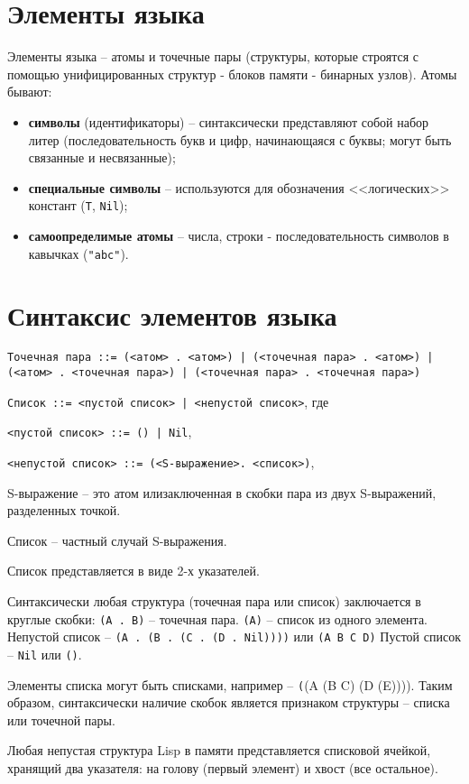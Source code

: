 \section{Элементы языка}

Элементы языка -- атомы и точечные пары (структуры, которые строятся с помощью унифицированных структур - блоков памяти - бинарных узлов). Атомы бывают:
\begin{itemize}
    \item \textbf{символы} (идентификаторы) -- синтаксически представляют собой набор литер (последовательность букв и цифр, начинающаяся с буквы; могут быть связанные и несвязанные);
    \item \textbf{специальные символы} -- используются для обозначения <<логических>> констант (\texttt{T}, \texttt{Nil});
    \item \textbf{самоопределимые атомы} -- числа, строки - последовательность символов в кавычках (\texttt{"abc"}).
\end{itemize}


\section{Синтаксис элементов языка}

\texttt{Точечная пара ::= (<атом> . <атом>) | (<точечная пара> . <атом>) | (<атом> . <точечная пара>) | (<точечная пара> . <точечная пара>)}

\texttt{Список ::= <пустой список> | <непустой список>}, где

\texttt{<пустой список> ::= () | Nil},

\texttt{<непустой список> ::= (<S-выражение>. <список>)},

S-выражение -- это атом илизаключенная в скобки пара из двух S-выражений, разделенных точкой.

Список -- частный случай S-выражения.

Список представляется в виде 2-х указателей.

Синтаксически любая структура (точечная пара или список) заключается в круглые скобки:
\texttt{(A . B)} -- точечная пара.
\texttt{(A)} -- список из одного элемента.
Непустой список -- \texttt{(A . (B . (C . (D . Nil))))} или \texttt{(A B C D)}
Пустой список -- \texttt{Nil} или \texttt{()}.

Элементы списка могут быть списками, например -- \texttt((A (B C) (D (E)))). Таким образом, синтаксически наличие скобок является признаком структуры -- списка или точечной пары.

Любая непустая структура Lisp в памяти представляется  списковой ячейкой, хранящий два указателя: на голову (первый элемент) и хвост (все остальное).
